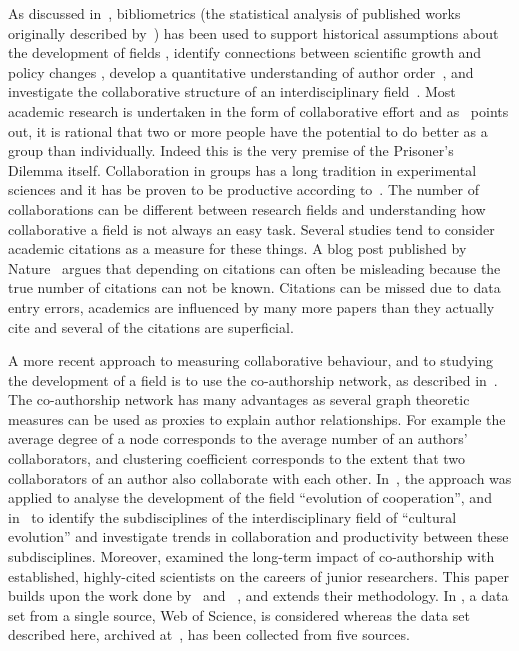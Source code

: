 As discussed in~\cite{youngblood2018}, bibliometrics (the statistical analysis
of published works originally described by~\cite{pritchard1969}) has been used
to support historical assumptions about the development of fields
\cite{raina1998}, identify connections between scientific growth and policy
changes \cite{das2016}, develop a quantitative understanding of author
order~\cite{sekara2018}, and investigate the collaborative structure of an
interdisciplinary field~\cite{Liu2015}. Most academic research is undertaken in
the form of collaborative effort and as~\cite{Kyvik2017} points out, it is
rational that two or more people have the potential to do better as a group
than individually. Indeed this is the very premise of the Prisoner's Dilemma itself.
Collaboration in groups has a long tradition in experimental
sciences and it has be proven to be productive according
to~\cite{Etzkowitz1992}. The number of collaborations can be different
between research fields and understanding how collaborative a field is not
always an easy task. Several studies tend to consider academic citations as a
measure for these things. A blog post published by Nature~\cite{nature_blog}
argues that depending on citations can often be misleading because the true
number of citations can not be known. Citations can be missed due to data entry
errors, academics are influenced by many more papers than they actually cite and
several of the citations are superficial.

A more recent approach to measuring collaborative behaviour, and to studying the
development of a field is to use the co-authorship network, as described
in~\cite{Liu2015}. The co-authorship network has many advantages as several
graph theoretic measures can be used as proxies to explain author relationships.
For example the average degree of a node corresponds to the average number of
an authors' collaborators, and clustering coefficient corresponds to the extent that
two collaborators of an author also collaborate with each other.
In~\cite{Liu2015}, the approach was applied to analyse the development of the field
``evolution of cooperation'', and in~\cite{youngblood2018} to identify the
subdisciplines of the interdisciplinary field of ``cultural evolution'' and
investigate trends in collaboration and productivity between these subdisciplines.
Moreover, \cite{Li2019} examined the
long-term impact of co-authorship with established, highly-cited scientists on
the careers of junior researchers. This paper builds upon the work done
by~\cite{Liu2015} and ~\cite{youngblood2018}, and extends their methodology.
In \cite{Liu2015, youngblood2018}, a data set from a
single source, Web of Science, is considered whereas the data set described here, archived
at~\cite{pd_data_2018}, has been collected from five sources.

